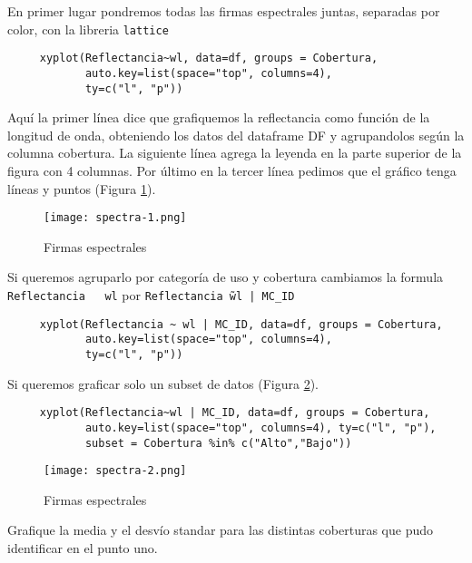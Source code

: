 \begin{exa}
     En primer lugar pondremos todas las firmas espectrales juntas, separadas
     por color, con la libreria \texttt{lattice}
     \begin{lstlisting}
     xyplot(Reflectancia~wl, data=df, groups = Cobertura,
            auto.key=list(space="top", columns=4),
            ty=c("l", "p"))
     \end{lstlisting}
     Aqu\'i la primer l\'inea dice que grafiquemos la reflectancia como funci\'on de
     la longitud de onda, obteniendo los datos del dataframe DF y agrupandolos
     seg\'un la columna cobertura. La siguiente l\'inea agrega la leyenda en la
     parte superior de la figura con 4 columnas. Por \'ultimo en la tercer l\'inea
     pedimos que el gr\'afico tenga l\'ineas y puntos (Figura \ref{fig:spectra-1}).

     \begin{figure}[h!]
     \begin{center}
         \texttt{[image: spectra-1.png]}
     \end{center}
     \caption{Firmas espectrales}
     \label{fig:spectra-1}
     \end{figure}

     Si queremos agruparlo por categor\'ia de uso y cobertura cambiamos la formula
     \texttt{Reflectancia ~ wl} por \texttt{Reflectancia \~ wl | MC\_ID}
     \begin{lstlisting}
     xyplot(Reflectancia ~ wl | MC_ID, data=df, groups = Cobertura,
            auto.key=list(space="top", columns=4),
            ty=c("l", "p"))
     \end{lstlisting}

     Si queremos graficar solo un subset de datos (Figura \ref{fig:spectra-2}).

     \begin{lstlisting}
     xyplot(Reflectancia~wl | MC_ID, data=df, groups = Cobertura,
            auto.key=list(space="top", columns=4), ty=c("l", "p"),
            subset = Cobertura %in% c("Alto","Bajo"))
     \end{lstlisting}
     \begin{figure}[h!]
     \begin{center}
         \texttt{[image: spectra-2.png]}
     \end{center}
     \caption{Firmas espectrales}
     \label{fig:spectra-2}
     \end{figure}
 \end{exa}

\begin{act}
    Grafique la media y el desv\'io standar para las distintas coberturas que pudo
     identificar en el punto uno.
\end{act}
